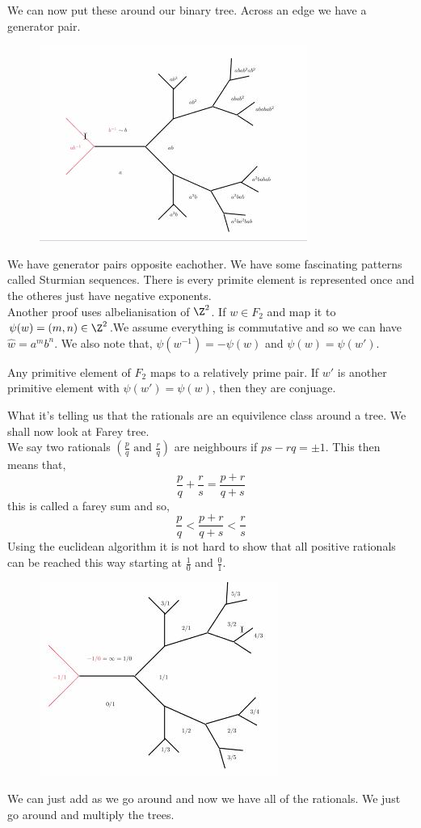 \documentclass{article}
\begin{document}
We can now put these around our binary tree. Across an edge we have a generator pair.
\begin{figure}[!ht]
  \centering
  \includegraphics{./figures/L1.4}
\end{figure}
We have generator pairs opposite eachother. We have some fascinating patterns called Sturmian sequences. There is every primite element is represented once and the otheres just have negative exponents.\\

Another proof uses albelianisation of $\Z^2$. If $w \in F_2$ and map it to $\psi (w) = (m, n) \in \Z^2$.We assume everything is commutative and so we can have $\hat w = a^mb^n$. We also note that, $\psi(w^{-1}) = -\psi(w)$ and $\psi(w) = \psi(w')$.\\

\begin{nthm}
  Any primitive element of $F_2$ maps to a relatively prime pair. If $w'$ is another primitive element with $\psi(w') = \psi(w)$, then they are conjuage.
\end{nthm}

What it's telling us that the rationals are an equivilence class around a tree. We shall now look at Farey tree. \\

We say two rationals $\left(\frac{p}{q} \text{ and } \frac{r}{q}\right)$ are neighbours if $ps - rq = \pm 1$. This then means that,
$$ \frac{p}{q} + \frac{r}{s} = \frac{p+r}{q+s} $$
this is called a farey sum and so,
$$ \frac{p}{q} < \frac{p + r}{q + s} < \frac{r}{s} $$
Using the euclidean algorithm it is not hard to show that all positive rationals can be reached this way starting at $\frac{1}{0}$ and $\frac{0}{1}$.
\begin{figure}[!ht]
  \centering
  \includegraphics{./figures/L1.5}
\end{figure}
We can just add as we go around and now we have all of the rationals.
We just go around and multiply the trees.\\
\end{document}
